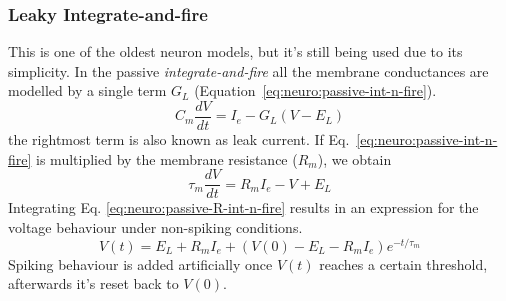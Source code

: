 \subsubsection{Leaky Integrate-and-fire}
This is one of the oldest neuron models, but it's still being used due to its simplicity. In the passive \emph{integrate-and-fire} all the membrane conductances are modelled by a single term $G_{L}$ (Equation~\ref{eq:neuro:passive-int-n-fire}).
\begin{equation}
C_{m}\frac{dV}{dt} = I_{e} - G_{L}\left( V - E_{L} \right) 
\label{eq:neuro:passive-int-n-fire}
\end{equation}
the rightmost term is also known as leak current. If Eq.~\ref{eq:neuro:passive-int-n-fire} is multiplied by the membrane resistance ($R_{m}$), we obtain
\begin{equation}
\tau_{m}\frac{dV}{dt} = R_{m}I_{e} - V + E_{L}  
\label{eq:neuro:passive-R-int-n-fire}
\end{equation}
Integrating Eq. \ref{eq:neuro:passive-R-int-n-fire} results in an expression for the voltage behaviour under non-spiking conditions.
\begin{equation}
V\left( t \right) = E_{L} + R_{m}I_{e} + 
                    \left( V\left( 0 \right) - E_{L} - R_{m}I_{e}\right) e^{ -t/\tau_{m}}
\label{eq:neuro:passive-V-int-n-fire}
\end{equation}
Spiking behaviour is added artificially once $V(t)$ reaches a certain threshold, afterwards it's reset back to $V(0)$.


